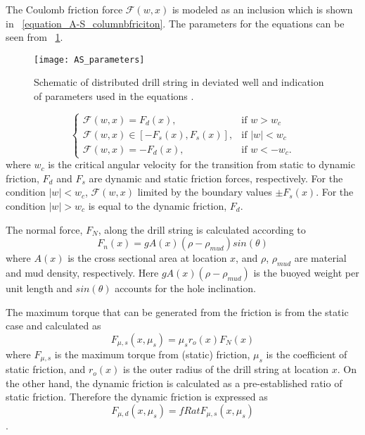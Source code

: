 The Coulomb friction force $\mathcal{F}(w,x)$ is modeled as an inclusion which is shown in \equationname~\ref{equation_A-S_columnbfriciton}. The parameters for the equations can be seen from \figurename~\ref{figure_AS_equation_schematic}.
\begin{figure}
  \centering
  \texttt{[image: AS\_parameters]}
  \caption[Schematic of distributed drill string in deviated well]{Schematic of distributed drill string in deviated well and indication of parameters used in the equations \cite{ref:aarsnes2017a}.}\label{figure_AS_equation_schematic}
\end{figure}
\begin{equation}\label{equation_A-S_columnbfriciton}
  \begin{cases}
     \mathcal{F}(w,x) = F_{d}(x), & \mbox{if } w>w_c \\
     \mathcal{F}(w,x) \in [-F_{s}(x), F_{s}(x)], & \mbox{if } |w|<w_c \ \\
     \mathcal{F}(w,x) = -F_{d}(x), & \mbox{if } w < -w_c.
  \end{cases}
\end{equation}
where $w_c$ is the critical angular velocity for the transition from static to dynamic friction, $F_{d}$ and $F_{s}$ are dynamic and static friction forces, respectively. For the condition $|w|<w_c$, $\mathcal{F}(w,x)$ limited by the boundary values $\pm F_{s}(x)$.  For the condition $|w|>w_c$ is equal to the dynamic friction, $F_{d}$.

The normal force, $F_N$, along the drill string is calculated according to
\begin{equation}\label{equation_AS_normal_force}
  F_n(x) = gA(x)(\rho-\rho_{mud})sin(\theta)
\end{equation}
where $A(x)$ is the cross sectional area at location $x$, and $\rho$, $\rho_{mud}$ are material and mud density, respectively.  Here $gA(x)(\rho-\rho_{mud})$ is the buoyed weight per unit length and $sin(\theta)$ accounts for the hole inclination.

The maximum torque that can be generated from the friction is from the static case and calculated as
\begin{equation}\label{equation_A-S_static_fric}
  F_{\mu,s}(x,\mu_s) = \mu_s r_o(x) F_N(x)
\end{equation}
where $F_{\mu,s}$ is the maximum torque from (static) friction, $\mu_s$ is the coefficient of static friction, and $r_o(x)$ is the outer radius of the drill string at location $x$. On the other hand, the dynamic friction is calculated as a pre-established ratio of static friction. Therefore the dynamic friction is expressed as 
\begin{equation}\label{equation_A-S_dynamic_fric}
  F_{\mu,d}(x,\mu_s) = fRat F_{\mu,s}(x,\mu_s)
\end{equation}.

